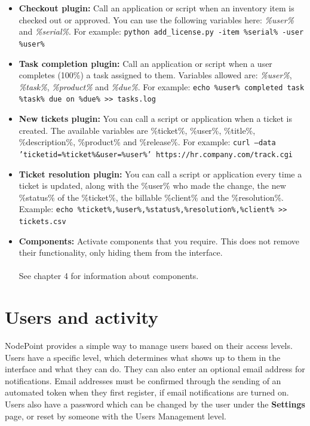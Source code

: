 \documentclass[11pt]{article}
\begin{document}
\begin{itemize}
\item \textbf{Checkout plugin:} Call an application or script when an inventory item is checked out or approved. You can use the following variables here: \textit{\%user\%} and \textit{\%serial\%}. For example: \texttt{python add\_license.py -item \%serial\% -user \%user\%}
\item \textbf{Task completion plugin:} Call an application or script when a user completes (100\%) a task assigned to them. Variables allowed are: \textit{\%user\%}, \textit{\%task\%}, \textit{\%product\%} and \textit{\%due\%}. For example: \texttt{echo \%user\% completed task \%task\% due on \%due\% >> tasks.log}
\item \textbf{New tickets plugin:} You can call a script or application when a ticket is created. The available variables are \%ticket\%, \%user\%, \%title\%, \%description\%, \%product\% and \%release\%. For example: \texttt{curl --data 'ticketid=\%ticket\%\&user=\%user\%' https://hr.company.com/track.cgi}
\item \textbf{Ticket resolution plugin:} You can call a script or application every time a ticket is updated, along with the \%user\% who made the change, the new \%status\% of the \%ticket\%, the billable \%client\% and the \%resolution\%. Example: \texttt{echo \%ticket\%,\%user\%,\%status\%,\%resolution\%,\%client\% >> tickets.csv}
\item \textbf{Components:} Activate components that you require. This does not remove their functionality, only hiding them from the interface.\\\\See chapter 4 for information about components.
\end{itemize}

\clearpage

\section{Users and activity}
NodePoint provides a simple way to manage users based on their access levels. Users have a specific level, which determines what shows up to them in the interface and what they can do. They can also enter an optional email address for notifications. Email addresses must be confirmed through the sending of an automated token when they first register, if email notifications are turned on. Users also have a password which can be changed by the user under the \textbf{Settings} page, or reset by someone with the Users Management level.
\end{document}
